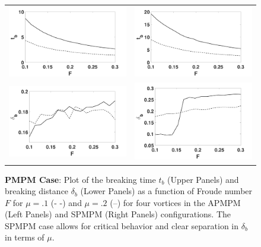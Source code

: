 \documentclass[a4paper,11pt]{article}
\begin{document}
\begin{figure}[!h]
\centering
\begin{tabular}{cc}
\includegraphics[width=.5\textwidth]{froude_comp_pmpm} & \includegraphics[width=.5\textwidth]{froude_comp_pmpm_sym}\\
\includegraphics[width=.5\textwidth]{zmb_pmpm} & \includegraphics[width=.5\textwidth]{zmb_pmpm_sym}
\end{tabular}
\caption{\small {\bf PMPM Case}: Plot of the breaking time $t_{b}$ (Upper Panels) and breaking distance $\delta_{b}$ (Lower Panels) as a function of Froude number $F$ for $\mu=.1$ (- -) and $\mu=.2$ (--) for four vortices in the APMPM (Left Panels) and SPMPM (Right Panels) configurations.  The SPMPM case allows for critical behavior and clear separation in $\delta_{b}$ in terms of $\mu$.}
\label{fig:froudecomp_pmpm}
\end{figure}
\end{document}
